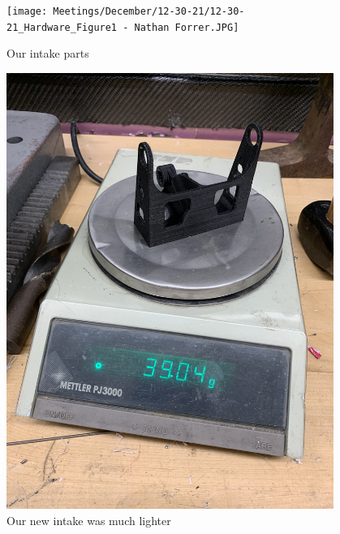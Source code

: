 \begin{figure}[ht]
\centering
\begin{minipage}[b]{.48\textwidth}
  \centering
  \texttt{[image: Meetings/December/12-30-21/12-30-21\_Hardware\_Figure1 - Nathan Forrer.JPG]}
  \caption{Our intake parts}
  \label{fig:123021_1}
\end{minipage}%
\hfill%
\begin{minipage}[b]{.48\textwidth}
  \centering
  \includegraphics[width=0.95\textwidth]{Meetings/December/12-30-21/12-30-21_Hardware_Figure2 - Nathan Forrer.jpg}
  \caption{Our new intake was much lighter}
  \label{fig:123021_2}
\end{minipage}
\end{figure}

